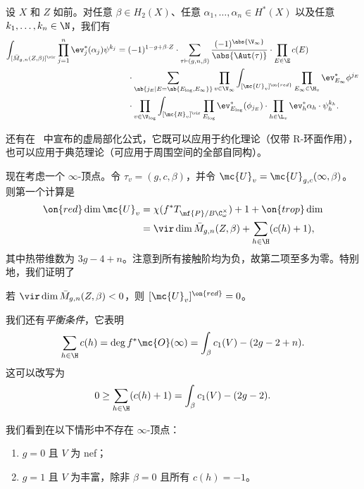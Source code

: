 \begin{thm}
    设 \(X\) 和 \(Z\) 如前。对任意 \(\beta \in H_2(X)\)、任意 \(\alpha_1, \ldots, \alpha_n \in H^*(X)\) 以及任意 \(k_1, \ldots, k_n \in \N\)，我们有
    \begin{align*}
        \int_{[\bar{M}_{g,n}(Z,\beta)]^{\vir}} \prod_{j=1}^n \ev_j^* (\alpha_j) \psi^{k_j}={}& (-1)^{1-g+\beta \cdot Z} \cdot \sum_{\tau \vdash (g,n,\beta)} \frac{(-1)^{\abs{\V_{\infty}}}}{\abs{\Aut(\tau)}} \cdot \prod_{E \in \E} c(E) \\
        & \cdot \sum_{\ab\{j_E \mid E = \ab\{E_{\log}, E_{\infty}\}\}}  \prod_{v \in \V_{\infty}} \int_{[\mc{U}_v]^{\on{red}}} \prod_{E_{\infty} \in \H_v} \ev_{E_{\infty}}^* \phi^{j_E}  \\
        &  \cdot \prod_{v \in \V_{\log}} \int_{[\mc{R}_v]^{\vir}} \prod_{E_{\log}} \ev_{E_{\log}}^* (\phi_{j_E}) \cdot \prod_{h \in \L_v} \ev_h^* \alpha_h \cdot \psi_h^{k_h} .
    \end{align*}
\end{thm}

\begin{rmk}
    还有在~\cite{CJRlocalization} 中宣布的虚局部化公式，它既可以应用于约化理论（仅带 R-环面作用），也可以应用于典范理论（可应用于周围空间的全部自同构）。
\end{rmk}

现在考虑一个 \(\infty\)-顶点。令 \(\tau_v = (g, c, \beta)\)，并令 \(\mc{U}_v = \mc{U}_{g,c}(\infty, \beta)\)。则第一个计算是
\begin{align*}
    \on{red}\dim \mc{U}_v &= \chi(f^* T_{\mf{P}/B \C^{\times}_{\omega}}) + 1 + \on{trop}\dim  \\
    &= \vir\dim \bar{M}_{g,n}(Z, \beta) + \sum_{h \in \H } (c(h) + 1),
\end{align*}
其中热带维数为 \(3g-4+n\)。注意到所有接触阶均为负，故第二项至多为零。特别地，我们证明了
\begin{cor}
    若 \(\vir\dim \bar{M}_{g,n}(Z,\beta) < 0\)，则 \([\mc{U}_v]^{\on{red}} = 0\)。
\end{cor}
我们还有\textit{平衡条件}，它表明
\begin{equation}\label{eqn:balancing condition}
    \sum_{h \in \H} c(h) = \deg f^* \mc{O}(\infty) = \int_{\beta} c_1(V) - (2g-2+n).
\end{equation}
这可以改写为
\[ 0 \geq \sum_{h \in \H} (c(h)+1) = \int_{\beta} c_1(V) - (2g-2). \]
\begin{prop}
    我们看到在以下情形中不存在 \(\infty\)-顶点：
    \begin{enumerate}
        \item \(g = 0\) 且 \(V\) 为 nef；
        \item \(g=1\) 且 \(V\) 为丰富，除非 \(\beta = 0\) 且所有 \(c(h) = -1\)。
    \end{enumerate}
\end{prop}

